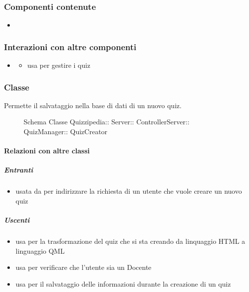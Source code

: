 \subsubsection{Componenti contenute}
\begin{itemize}
\item {}
\end{itemize}
\subsubsection{Interazioni con altre componenti}
\begin{itemize}
\item {}
\begin{itemize}
\item usa  per gestire i quiz
\end{itemize}
\end{itemize}
\subsubsection{Classe }
Permette il salvataggio nella base di dati di un nuovo quiz.
\begin{figure}[H]
\centering
\noindent{}
\caption[Schema Classe QuizCreator]{Schema Classe Quizzipedia:: Server:: ControllerServer:: QuizManager:: QuizCreator}
\end{figure}
\paragraph{Relazioni con altre classi}
\subparagraph{Entranti}
\begin{itemize}
\item usata da  per indirizzare la richiesta di un utente che vuole creare un nuovo quiz
\end{itemize}
\subparagraph{Uscenti}
\begin{itemize}
\item usa  per la trasformazione del quiz che si sta creando da linquaggio HTML a linguaggio QML
\item usa  per verificare che l'utente sia un Docente
\item usa  per il salvataggio delle informazioni durante la creazione di un quiz
\end{itemize}
